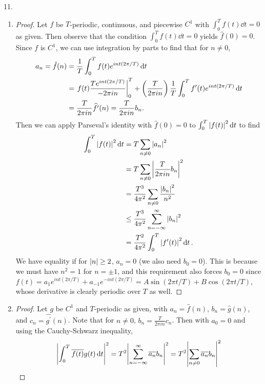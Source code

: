 \documentclass[11pt]{article}
\newcommand{\br}[1]{\left(#1\right)}
\begin{document}
11.
\begin{enumerate}[label=(\alph*)]
    \item \begin{proof}
      Let $f$ be $T$-periodic, continuous, and piecewise $C^1$ with $\int_0^T f(t)\dd{t} = 0$ as given. Then observe that the condition $\int_0^T f(t)\dd{t} = 0$ yields $\hat{f}(0) = 0$. Since $f$ is $C^1$, we can use integration by parts to find that for $n\neq 0$, \begin{align*}
        a_n = \hat{f}(n) &= \frac{1}{T}\int_0^T f(t)e^{int(2\pi/T)}\dd{t}\\
        &= \eval{f(t)\frac{T e^{int(2\pi/T)} }{-2\pi in} }_0^T + \br{\frac{T}{2\pi in}}\frac{1}{T}\int_0^T f^{\prime}(t)e^{int(2\pi/T)}\dd{t}\\
        &= \frac{T}{2\pi in}\widehat{f^{\prime}}(n) = \frac{T}{2\pi in} b_n.
      \end{align*}
      Then we can apply Parseval's identity with $\hat{f}(0) = 0$ to $\int_0^T \abs{f(t)}^2\dd{t}$ to find
      \begin{align*}
        \int_0^T \abs{f(t)}^2\dd{t} &= T\sum_{n\neq 0} \abs{a_n}^2\\
        &= T\sum_{n\neq 0} \abs{\frac{T}{2\pi in} b_n}^2\\
        &= \frac{T^3}{4\pi^2}\sum_{n\neq 0}\frac{\abs{b_n}^2}{n^2} \\
        &\leq \frac{T^3}{4\pi^2}\sum_{n=-\infty}^{\infty}\abs{b_n}^2\\
        &= \frac{T^2}{4\pi^2}\int_0^T \abs{f^{\prime}(t)}^2\dd{t}.
      \end{align*}
      We have equality if for $\abs{n}\geq 2$, $a_n = 0$ (we also need $b_0 = 0$). This is because we must have $n^2 = 1$ for $n = \pm 1$, and this requirement also forces $b_0 = 0$ since $f(t) = a_1e^{int(2\pi/T)} + a_{-1}e^{-int(2\pi/T)} = A\sin(2\pi t/T) + B\cos(2\pi t/T)$, whose derivative is clearly periodic over $T$ as well.
    \end{proof}
    \item \begin{proof}
      Let $g$ be $C^1$ and $T$-periodic as given, with $a_n = \hat{f}(n)$, $b_n = \hat{g}(n)$, and $c_n = \widehat{g^{\prime}}(n)$. Note that for $n\neq 0$, $b_n = \frac{T}{2\pi in} c_n$. Then with $a_0 = 0$ and using the Cauchy-Schwarz inequality, \begin{align*}
        \abs{\int_0^T \overline{f(t)}g(t)\dd{t}}^2 &= T^2\abs{\sum_{n=-\infty}^{\infty} \overline{a_n}b_n}^2 =T^2\abs{\sum_{n\neq 0} \overline{a_n}b_n}^2\\

\end{align*}
\end{proof}
\end{enumerate}
\end{document}
